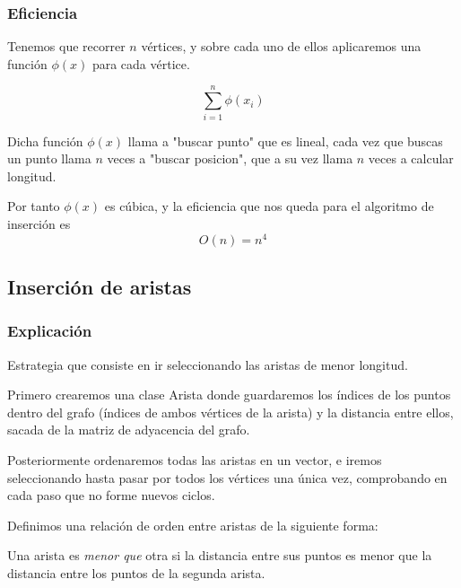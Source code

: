 \subsubsection{Eficiencia}
\begin{frame}
	\begin{block}
	Tenemos que recorrer $n$ vértices, y sobre cada uno de ellos aplicaremos una función 		
	$\phi(x)$ para cada vértice.

	\[ \sum_{i=1}^{n} \phi(x_i)\]
	\end{block}
	\begin{block}
	Dicha función $\phi(x)$ llama a "buscar punto" que es lineal, cada vez que buscas un 
	punto llama $n$ veces a "buscar posicion", que a su vez llama $n$ veces a calcular 
	longitud.

	Por tanto $\phi(x)$ es cúbica, y la eficiencia que nos queda para el algoritmo de 
	inserción es
	\[ O(n) = n^4 \]
	\end{block}
\end{frame}



















\subsection{Inserción de aristas}
\subsubsection{Explicación}

\begin{frame}
	\begin{block}{  }
	Estrategia que consiste en ir seleccionando las aristas de menor longitud.
	
	Primero crearemos una clase Arista donde guardaremos los índices de los puntos dentro 
	del grafo (índices de ambos vértices de la arista) y la distancia entre ellos, sacada 
	de la matriz de adyacencia del grafo.
	
	Posteriormente ordenaremos todas las aristas en un vector, e iremos seleccionando 
	hasta pasar por todos los vértices una única vez, comprobando en cada paso que no 
	forme nuevos ciclos.
	\end{block}
	
	\begin{block}
	Definimos una relación de orden entre aristas de la siguiente forma:

	Una arista es \textit{menor que} otra si la distancia entre sus puntos es menor que la 
	distancia entre los puntos de la segunda arista.
	\end{block}
\end{frame}

